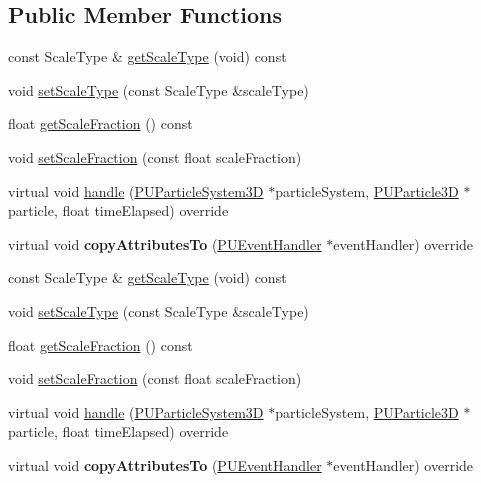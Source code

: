 \subsection*{Public Member Functions}
\begin{DoxyCompactItemize}
\item 
const Scale\+Type \& \hyperlink{classPUDoScaleEventHandler_a01211c36b4d5bd44ad2f41540489db54}{get\+Scale\+Type} (void) const
\item 
void \hyperlink{classPUDoScaleEventHandler_a6e53868333c76e91eb38d608bc2e06b9}{set\+Scale\+Type} (const Scale\+Type \&scale\+Type)
\item 
float \hyperlink{classPUDoScaleEventHandler_abd61c6dbf5cfa5e249416c68adf05e10}{get\+Scale\+Fraction} () const
\item 
void \hyperlink{classPUDoScaleEventHandler_a78a674ef94c1e27dfb44d858ab7355bf}{set\+Scale\+Fraction} (const float scale\+Fraction)
\item 
virtual void \hyperlink{classPUDoScaleEventHandler_abf88206cfacb19b198323e5a15c74f6a}{handle} (\hyperlink{classPUParticleSystem3D}{P\+U\+Particle\+System3D} $\ast$particle\+System, \hyperlink{structPUParticle3D}{P\+U\+Particle3D} $\ast$particle, float time\+Elapsed) override
\item 
\mbox{\label{classPUDoScaleEventHandler_afd4e5a3da4abb04cbab2f5ffa81a6532}} 
virtual void {\bfseries copy\+Attributes\+To} (\hyperlink{classPUEventHandler}{P\+U\+Event\+Handler} $\ast$event\+Handler) override
\item 
const Scale\+Type \& \hyperlink{classPUDoScaleEventHandler_a65e369cb96be7ad2bc27974c106facf0}{get\+Scale\+Type} (void) const
\item 
void \hyperlink{classPUDoScaleEventHandler_a6e53868333c76e91eb38d608bc2e06b9}{set\+Scale\+Type} (const Scale\+Type \&scale\+Type)
\item 
float \hyperlink{classPUDoScaleEventHandler_abd61c6dbf5cfa5e249416c68adf05e10}{get\+Scale\+Fraction} () const
\item 
void \hyperlink{classPUDoScaleEventHandler_a78a674ef94c1e27dfb44d858ab7355bf}{set\+Scale\+Fraction} (const float scale\+Fraction)
\item 
virtual void \hyperlink{classPUDoScaleEventHandler_a0d4d629277b91a58487794e2791f041d}{handle} (\hyperlink{classPUParticleSystem3D}{P\+U\+Particle\+System3D} $\ast$particle\+System, \hyperlink{structPUParticle3D}{P\+U\+Particle3D} $\ast$particle, float time\+Elapsed) override
\item 
\mbox{\label{classPUDoScaleEventHandler_a276401d9a5753bd9b6239e83e08406cb}} 
virtual void {\bfseries copy\+Attributes\+To} (\hyperlink{classPUEventHandler}{P\+U\+Event\+Handler} $\ast$event\+Handler) override
\end{DoxyCompactItemize}
